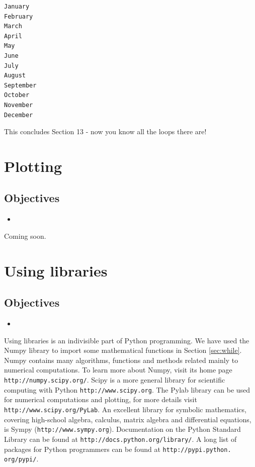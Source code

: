 \documentclass[article,A4,12pt]{llncs}
\begin{document}
\begin{verbatim}
January
February
March
April
May
June
July
August
September
October
November
December
\end{verbatim}
This concludes Section 13 - now you know all the loops there are!

\section{Plotting}

\subsection{Objectives}

\begin{itemize}
\item
\end{itemize}
Coming soon.

\section{Using libraries}\label{subsec:importinglib}

\subsection{Objectives}

\begin{itemize}
\item
\end{itemize}

Using libraries is an indivisible part of Python programming. We have 
used the Numpy library to import some mathematical functions in Section 
\ref{sec:while}. Numpy contains many algorithms, functions and methods 
related mainly to numerical computations. To learn more about Numpy,
visit its home page {\tt http://numpy.scipy.org/}. Scipy is a more 
general library for scientific computing with Python {\tt http://www.scipy.org}.
The Pylab library can be used for numerical computations and plotting,
for more details visit {\tt http://www.scipy.org/PyLab}. An excellent 
library for symbolic mathematics, covering high-school algebra, calculus,
matrix algebra and differential equations, is Sympy ({\tt http://www.sympy.org}).
Documentation on the Python Standard Library can be found at 
{\tt http://docs.python.org/library/}. A long list of packages for Python 
programmers can be found at {\tt http://pypi.python. org/pypi/}.
\end{document}
